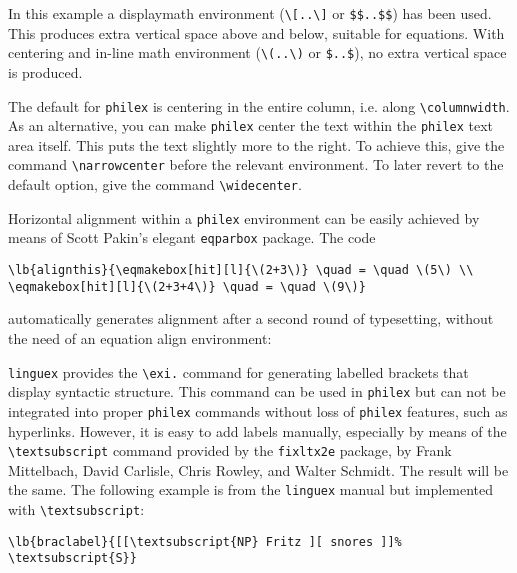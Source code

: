 \documentclass[11pt]{article}
\begin{document}
	In this example a displaymath environment (\verb+\[..\]+ or \verb+$$..$$+) has been used. This produces extra vertical space above and below, suitable for equations. With centering and in-line math environment (\verb+\(..\)+ or \verb+$..$+), no extra vertical space is produced.
	
	
The default for \verb+philex+ is centering in the entire column, i.e. along \verb+\columnwidth+. As an alternative, you can make \verb+philex+ center the text within the \verb+philex+ text area itself. This puts the text slightly more to the right. To achieve this, give the command \verb+\narrowcenter+ before the relevant environment. To later revert to the default option, give the command \verb+\widecenter+.

Horizontal alignment  within a \verb+philex+ environment can be easily achieved by means of Scott Pakin's elegant \verb+eqparbox+ package. The code

\begin{verbatim}
\lb{alignthis}{\eqmakebox[hit][l]{\(2+3\)} \quad = \quad \(5\) \\
\eqmakebox[hit][l]{\(2+3+4\)} \quad = \quad \(9\)}
\end{verbatim}
	automatically generates alignment after a second round of typesetting, without the need of an equation align environment:


\verb+linguex+ provides the \verb+\exi.+  command for generating labelled brackets that display syntactic structure. This command can be used in \verb+philex+ but can not be integrated into proper \verb+philex+ commands without loss of \verb+philex+ features, such as hyperlinks. However, it is easy to add labels manually, especially by means of the \verb+\textsubscript+ command provided by the \verb+fixltx2e+ package, by Frank Mittelbach, David Carlisle, Chris Rowley, and Walter Schmidt. The result will be the same. The following example is from the \verb+linguex+ manual but implemented with \verb+\textsubscript+:

\begin{verbatim}
\lb{braclabel}{[[\textsubscript{NP} Fritz ][ snores ]]%
\textsubscript{S}}
\end{verbatim}
\end{document}
